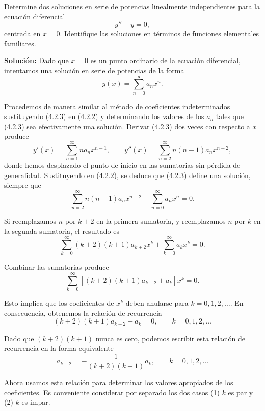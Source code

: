 \begin{example}
    Determine dos soluciones en serie de potencias linealmente independientes para la ecuación diferencial
\begin{equation} \tag{9.2.2}
y'' + y = 0,
\end{equation}
centrada en $x = 0$. Identifique las soluciones en términos de funciones elementales familiares.

\noindent \textbf{Solución:} \quad Dado que $x = 0$ es un punto ordinario de la ecuación diferencial, intentamos una solución en serie de potencias de la forma
\begin{equation} \tag{4.2.3}
y(x) = \sum_{n=0}^{\infty} a_n x^n.
\end{equation}

Procedemos de manera similar al método de coeficientes indeterminados sustituyendo (4.2.3) en (4.2.2) y determinando los valores de los $a_n$ tales que (4.2.3) sea efectivamente una solución. Derivar (4.2.3) dos veces con respecto a $x$ produce
\[ y'(x) = \sum_{n=1}^{\infty} n a_n x^{n-1}, \qquad y''(x) = \sum_{n=2}^{\infty} n(n-1)a_n x^{n-2}, \]
donde hemos desplazado el punto de inicio en las sumatorias sin pérdida de generalidad. Sustituyendo en (4.2.2), se deduce que (4.2.3) define una solución, siempre que
\[ \sum_{n=2}^{\infty} n(n-1)a_n x^{n-2} + \sum_{n=0}^{\infty} a_n x^n = 0. \]

Si reemplazamos $n$ por $k + 2$ en la primera sumatoria, y reemplazamos $n$ por $k$ en la segunda sumatoria, el resultado es
\[ \sum_{k=0}^{\infty} (k+2)(k+1)a_{k+2}x^k + \sum_{k=0}^{\infty} a_k x^k = 0. \]

Combinar las sumatorias produce
\[ \sum_{k=0}^{\infty} [(k+2)(k+1)a_{k+2} + a_k]x^k = 0. \]

Esto implica que los coeficientes de $x^k$ deben anularse para $k = 0, 1, 2, \dots$. En consecuencia, obtenemos la relación de recurrencia
\[ (k+2)(k+1)a_{k+2} + a_k = 0, \qquad k = 0, 1, 2, \dots \]

Dado que $(k+2)(k+1)$ nunca es cero, podemos escribir esta relación de recurrencia en la forma equivalente
\begin{equation} \tag{4.2.4}
a_{k+2} = -\frac{1}{(k+2)(k+1)}a_k, \qquad k = 0, 1, 2, \dots
\end{equation}

Ahora usamos esta relación para determinar los valores apropiados de los coeficientes. Es conveniente considerar por separado los dos casos (1) $k$ es par y (2) $k$ es impar.


\end{example}
